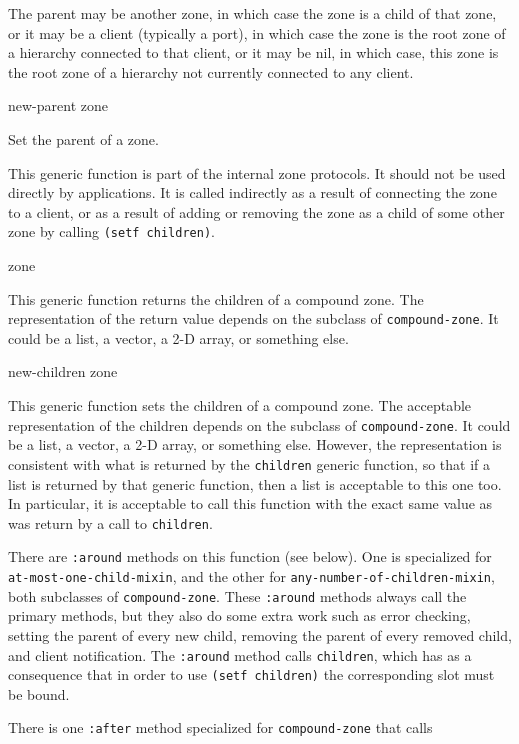The parent may be another zone, in which case the zone is a child of
that zone, or it may be a client (typically a port), in which case the
zone is the root zone of a hierarchy connected to that client, or it
may be nil, in which case, this zone is the root zone of a hierarchy
not currently connected to any client.

 {new-parent zone}

Set the parent of a zone.

This generic function is part of the internal zone protocols.  It
should not be used directly by applications.  It is called indirectly
as a result of connecting the zone to a client, or as a result of
adding or removing the zone as a child of some other zone by calling
\texttt{(setf children)}.

 {zone}

This generic function returns the children of a compound zone.  The
representation of the return value depends on the subclass of
\texttt{compound-zone}.  It could be a list, a vector, a 2-D array, or
something else.

 {new-children zone}

This generic function sets the children of a compound zone.  The
acceptable representation of the children depends on the subclass of
\texttt{compound-zone}.  It could be a list, a vector, a 2-D array, or
something else.  However, the representation is consistent with what
is returned by the \texttt{children} generic function, so that if a list is
returned by that generic function, then a list is acceptable to this
one too.  In particular, it is acceptable to call this function with
the exact same value as was return by a call to \texttt{children}.

There are \texttt{:around} methods on this function (see below).  One
is specialized for \texttt{at-most-one-child-mixin}, and the other for
\texttt{any-number-of-children-mixin}, both subclasses of
\texttt{compound-zone}.  These \texttt{:around} methods always call
the primary methods, but they also do some extra work such as error
checking, setting the parent of every new child, removing the parent
of every removed child, and client notification.  The \texttt{:around}
method calls \texttt{children}, which has as a consequence that in
order to use \texttt{(setf children)} the corresponding slot must be
bound.

There is one \texttt{:after} method specialized for
\texttt{compound-zone} that calls

